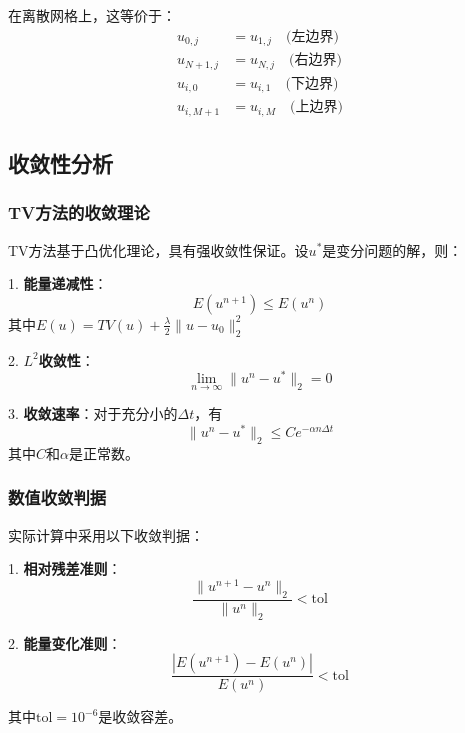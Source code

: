 \documentclass[a4paper,12pt]{ctexart}
\begin{document}
在离散网格上，这等价于：
\begin{align}
u_{0,j} &= u_{1,j} \quad \text{(左边界)} \\
u_{N+1,j} &= u_{N,j} \quad \text{(右边界)} \\
u_{i,0} &= u_{i,1} \quad \text{(下边界)} \\
u_{i,M+1} &= u_{i,M} \quad \text{(上边界)}
\end{align}

\subsection{收敛性分析}

\subsubsection{TV方法的收敛理论}

TV方法基于凸优化理论，具有强收敛性保证。设$u^*$是变分问题的解，则：

1. \textbf{能量递减性}：
\begin{equation}
E(u^{n+1}) \leq E(u^n)
\end{equation}
其中$E(u) = TV(u) + \frac{\lambda}{2}\|u-u_0\|_2^2$

2. \textbf{$L^2$收敛性}：
\begin{equation}
\lim_{n \to \infty} \|u^n - u^*\|_2 = 0
\end{equation}

3. \textbf{收敛速率}：对于充分小的$\Delta t$，有
\begin{equation}
\|u^n - u^*\|_2 \leq C e^{-\alpha n \Delta t}
\end{equation}
其中$C$和$\alpha$是正常数。

\subsubsection{数值收敛判据}

实际计算中采用以下收敛判据：

1. \textbf{相对残差准则}：
\begin{equation}
\frac{\|u^{n+1} - u^n\|_2}{\|u^n\|_2} < \text{tol}
\end{equation}

2. \textbf{能量变化准则}：
\begin{equation}
\frac{|E(u^{n+1}) - E(u^n)|}{E(u^n)} < \text{tol}
\end{equation}

其中$\text{tol} = 10^{-6}$是收敛容差。
\end{document}
